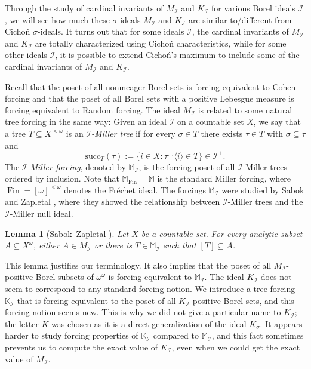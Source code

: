 \documentclass[a4paper,12pt]{amsart}
\newtheorem{lem}[thm]{Lemma}
\theoremstyle{definition}
\numberwithin{thm}{section}
\numberwithin{equation}{section}
\newcommand{\I}{\mathscr{I}}
\DeclareMathOperator{\Fin}{Fin}
\renewcommand{\subset}{\subseteq}
\begin{document}
    Through the study of cardinal invariants of $M_\I$ and $K_\I$ for various Borel ideals $\I$, we will see how much these $\sigma$-ideals $M_\I$ and $K_\I$ are similar to/different from Cicho\'n $\sigma$-ideals.
    It turns out that for some ideals $\I$, the cardinal invariants of $M_\I$ and $K_\I$ are totally characterized using Cicho\'n characteristics, while for some other ideals $\I$, it is possible to extend Cicho\'{n}'s maximum to include some of the cardinal invariants of $M_\I$ and $K_\I$.

    Recall that the poset of all nonmeager Borel sets is forcing equivalent to Cohen forcing and that the poset of all Borel sets with a positive Lebesgue measure  is forcing equivalent to Random forcing.
    The ideal $M_\I$ is related to some natural tree forcing in the same way: Given an ideal $\I$ on a countable set $X$, we say that a tree $T\subset X^{<\omega}$ is an \emph{$\I$-Miller tree} if for every $\sigma\in T$ there exists $\tau\in T$ with $\sigma\subset\tau$ and
    \[
    \mathrm{succ}_T(\tau):=\{i\in X: \tau^{\frown}\langle i\rangle\in T\}\in\I^+.
    \]
    The \emph{$\I$-Miller forcing}, denoted by $\mathbb{M}_{\I}$, is the forcing poset of all $\I$-Miller trees ordered by inclusion. Note that $\mathbb{M}_{\Fin}=\mathbb{M}$ is the standard Miller forcing, where $\Fin=[\omega]^{<\omega}$ denotes the Fr\'{e}chet ideal. The forcings $\mathbb{M}_\I$ were studied by Sabok and Zapletal \cite{SZ11}, where they showed the relationship between $\I$-Miller trees and the $\I$-Miller null ideal.
    
    \begin{lem}[{Sabok--Zapletal \cite{SZ11}}]
        Let $X$ be a countable set. For every analytic subset $A\subset X^\omega$, either $A \in M_\I$ or there is $T\in\mathbb{M}_\I$ such that $[T]\subset A$.
    \end{lem}
    
    This lemma justifies our terminology. It also implies that the poset of all $M_{\I}$-positive Borel subsets of $\omega^\omega$ is forcing equivalent to $\mathbb{M}_{\I}$. The ideal $K_\I$ does not seem to correspond to any standard forcing notion. We introduce a tree forcing $\mathbb{K}_\I$ that is forcing equivalent to the poset of all $K_\I$-positive Borel sets, and this forcing notion seems new. This is why we did not give a particular name to $K_\I$; the letter $K$ was chosen as it is a direct generalization of the ideal $K_\sigma$. 
    It appears harder to study forcing properties of $\mathbb{K}_\I$ compared to $\mathbb{M}_\I$, and this fact sometimes prevents us to compute the exact value of $K_\I$, even when we could get the exact value of $M_\I$.
\end{document}
